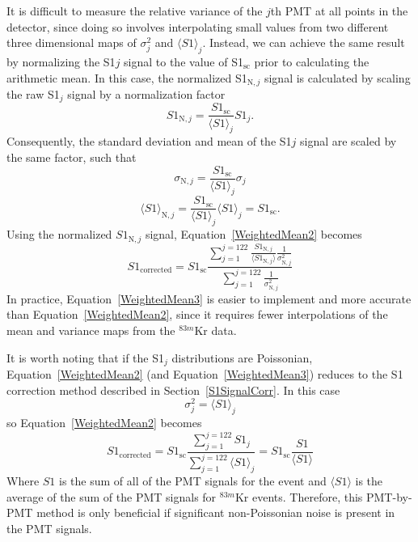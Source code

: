 It is difficult to measure the relative variance of the $j$th PMT at all points in the detector, since doing so involves interpolating small values from two different three dimensional maps of  $\sigma_j^2$ and $\langle S1 \rangle_{j}$.  Instead, we can achieve the same result by normalizing the S1$j$ signal to the value of S1$_{\mbox{sc}}$ prior to calculating the arithmetic mean.  In this case, the normalized S1$_{\text{N},j}$ signal is calculated by scaling the raw S1$_j$ signal by a normalization factor
\begin{equation}
S1_{\text{N},j}=\frac{S1_{\mbox{sc}}}{\langle S1 \rangle_{j}} S1_j.
\end{equation}
Consequently, the standard deviation and mean of the S1$j$ signal are scaled by the same factor, such that
\begin{equation}
\sigma_{\text{N},j} = \frac{S1_{\mbox{sc}}}{\langle S1 \rangle_{j}} \sigma_j
\end{equation}
\begin{equation}
\langle S1 \rangle_{\text{N},j} = \frac{S1_{\mbox{sc}}}{\langle S1 \rangle_{j}} \langle S1 \rangle_{j} = S1_{\mbox{sc}}.
\end{equation}
Using the normalized $S1_{\text{N},j}$ signal, Equation~\ref{WeightedMean2} becomes
\begin{equation} \label{WeightedMean3}
S1_{\mbox{corrected}} = S1_{\mbox{sc}} \frac{\sum_{j=1}^{j=122} \frac{S1_{\text{N},j}}{\langle S1_{\text{N},j} \rangle}\frac{1}{ \sigma_{\text{N},j}^2}}{ \sum_{j=1}^{j=122} \frac{1}{\sigma_{\text{N},j}^2}}
\end{equation}
In practice, Equation~\ref{WeightedMean3} is easier to implement and more accurate than Equation~\ref{WeightedMean2}, since it requires fewer interpolations of the mean and variance maps from the $^{83m}$Kr data.

It is worth noting that if the S1$_j$ distributions are Poissonian, Equation~\ref{WeightedMean2} (and Equation~\ref{WeightedMean3}) reduces to the S1 correction method described in Section~\ref{S1SignalCorr}.  In this case 
\begin{equation}
\sigma_{j}^2 = \langle S1 \rangle_{j}
\end{equation}
so Equation~\ref{WeightedMean2} becomes
\begin{equation}
S1_{\mbox{corrected}} = S1_{\mbox{sc}} \frac{\sum_{j=1}^{j=122} S1_j}{\sum_{j=1}^{j=122} \langle S1 \rangle_{j}} = S1_{\mbox{sc}} \frac{S1}{\langle S1 \rangle}
\end{equation}
Where $S1$ is the sum of all of the PMT signals for the event and $\langle S1 \rangle$ is the average of the sum of the PMT signals for $^{83m}$Kr events. Therefore, this PMT-by-PMT method is only beneficial if significant non-Poissonian noise is present in the PMT signals.

